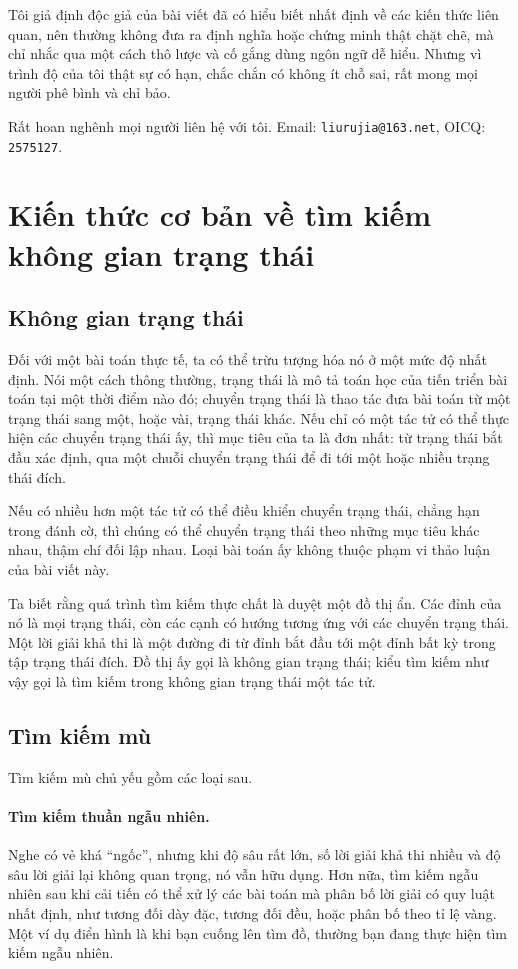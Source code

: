 \documentclass[11pt]{article}
\begin{document}
Tôi giả định độc giả của bài viết đã có hiểu biết nhất định về các kiến thức
liên quan, nên thường không đưa ra định nghĩa hoặc chứng minh thật chặt chẽ,
mà chỉ nhắc qua một cách thô lược và cố gắng dùng ngôn ngữ dễ hiểu. Nhưng vì
trình độ của tôi thật sự có hạn, chắc chắn có không ít chỗ sai, rất mong mọi
người phê bình và chỉ bảo.

Rất hoan nghênh mọi người liên hệ với tôi. Email: \texttt{liurujia@163.net},
OICQ: \texttt{2575127}.

\section{Kiến thức cơ bản về tìm kiếm không gian trạng thái}

\subsection{Không gian trạng thái}

Đối với một bài toán thực tế, ta có thể trừu tượng hóa nó ở một mức độ nhất
định. Nói một cách thông thường, trạng thái là mô tả toán học của tiến triển
bài toán tại một thời điểm nào đó; chuyển trạng thái là thao tác đưa bài toán
từ một trạng thái sang một, hoặc vài, trạng thái khác. Nếu chỉ có một tác tử
có thể thực hiện các chuyển trạng thái ấy, thì mục tiêu của ta là đơn nhất:
từ trạng thái bắt đầu xác định, qua một chuỗi chuyển trạng thái để đi tới một
hoặc nhiều trạng thái đích.

Nếu có nhiều hơn một tác tử có thể điều khiển chuyển trạng thái, chẳng hạn
trong đánh cờ, thì chúng có thể chuyển trạng thái theo những mục tiêu khác
nhau, thậm chí đối lập nhau. Loại bài toán ấy không thuộc phạm vi thảo luận
của bài viết này.

Ta biết rằng quá trình tìm kiếm thực chất là duyệt một đồ thị ẩn. Các đỉnh
của nó là mọi trạng thái, còn các cạnh có hướng tương ứng với các chuyển
trạng thái. Một lời giải khả thi là một đường đi từ đỉnh bắt đầu tới một đỉnh
bất kỳ trong tập trạng thái đích. Đồ thị ấy gọi là không gian trạng thái; kiểu
tìm kiếm như vậy gọi là tìm kiếm trong không gian trạng thái một tác tử.

\subsection{Tìm kiếm mù}

Tìm kiếm mù chủ yếu gồm các loại sau.

\paragraph{Tìm kiếm thuần ngẫu nhiên.}
Nghe có vẻ khá ``ngốc'', nhưng khi độ sâu rất lớn, số lời giải khả thi nhiều
và độ sâu lời giải lại không quan trọng, nó vẫn hữu dụng. Hơn nữa, tìm kiếm
ngẫu nhiên sau khi cải tiến có thể xử lý các bài toán mà phân bố lời giải có
quy luật nhất định, như tương đối dày đặc, tương đối đều, hoặc phân bố theo
tỉ lệ vàng. Một ví dụ điển hình là khi bạn cuống lên tìm đồ, thường bạn đang
thực hiện tìm kiếm ngẫu nhiên.
\end{document}
